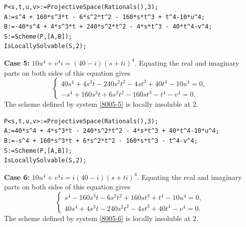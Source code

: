 \documentclass[a4paper,12pt,english,reqno]{amsart}
\begin{document}
\begin{lstlisting}
P<s,t,u,v>:=ProjectiveSpace(Rationals(),3);
A:=s^4 + 160*s^3*t - 6*s^2*t^2 - 160*s*t^3 + t^4-10*u^4;
B:=-40*s^4 + 4*s^3*t + 240*s^2*t^2 - 4*s*t^3 - 40*t^4-v^4;
S:=Scheme(P,[A,B]);
IsLocallySolvable(S,2);
\end{lstlisting}


{\bf Case 5:} $10u^4+v^4i=(40-i)(s+ti)^4$. Equating the real and imaginary parts on both sides of this equation gives
\begin{equation}\label{8005-5}
\begin{cases}
40s^4 + 4s^3t - 240s^2t^2 - 4st^3 + 40t^4 - 10u^4=0,\\
-s^4 + 160s^3t + 6s^2t^2 - 160st^3 - t^4 - v^4=0.
\end{cases}
\end{equation}
The scheme defined by system \eqref{8005-5} is locally insoluble at $2$.

\begin{lstlisting}
P<s,t,u,v>:=ProjectiveSpace(Rationals(),3);
A:=40*s^4 + 4*s^3*t - 240*s^2*t^2 - 4*s*t^3 + 40*t^4-10*u^4;
B:=-s^4 + 160*s^3*t + 6*s^2*t^2 - 160*s*t^3 - t^4-v^4;
S:=Scheme(P,[A,B]);
IsLocallySolvable(S,2);
\end{lstlisting}

{\bf Case 6:} $10u^4+v^4i=i(40-i)(s+ti)^4$. Equating the real and imaginary parts on both sides of this equation gives
\begin{equation}\label{8005-6}
\begin{cases}
s^4 - 160s^3t - 6s^2t^2 + 160st^3 + t^4 - 10u^4=0,\\
40s^4 + 4s^3t - 240s^2t^2 - 4st^3 + 40t^4 - v^4=0.
\end{cases}
\end{equation}
The scheme defined by system \eqref{8005-6} is locally insoluble at $2$.
\end{document}
